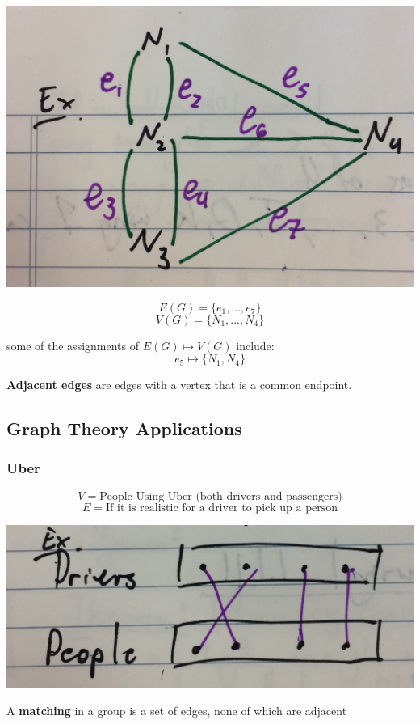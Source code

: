 \documentclass[12pt]{article}
\begin{document}
\includegraphics[scale=0.125]{lec2-1}

$$E(G) = \{ e_1, ... , e_7 \}$$
$$V(G) = \{ N_1, ... , N_4 \}$$

some of the assignments of $E(G) \mapsto V(G)$ include:
$$e_5 \mapsto \{ N_1, N_4 \}$$

\textbf{Adjacent edges} are edges with a vertex that is a common endpoint.

\subsection{Graph Theory Applications}

\subsubsection{Uber}

$$V = \text{People Using Uber (both drivers and passengers)}$$
$$E = \text{If it is realistic for a driver to pick up a person}$$

\includegraphics[scale=0.125]{lec2-2}

\begin{tcolorbox}[title=Definition: Matching]
	A \textbf{matching} in a group is a set of edges, none of which are adjacent
\end{tcolorbox}
\end{document}
